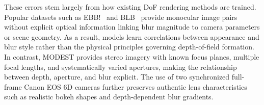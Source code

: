 These errors stem largely from how existing DoF rendering methods are trained. Popular datasets such as EBB!~\cite{ignatovebb} and BLB~\cite{bokehme_blb} provide monocular image pairs without explicit optical information linking blur magnitude to camera parameters or scene geometry. As a result, models learn correlations between appearance and blur style rather than the physical principles governing depth-of-field formation. In contrast, MODEST provides stereo imagery with known focus planes, multiple focal lengths, and systematically varied apertures, making the relationship between depth, aperture, and blur explicit. The use of two synchronized full-frame Canon EOS 6D cameras further preserves authentic lens characteristics such as realistic bokeh shapes and depth-dependent blur gradients. 







